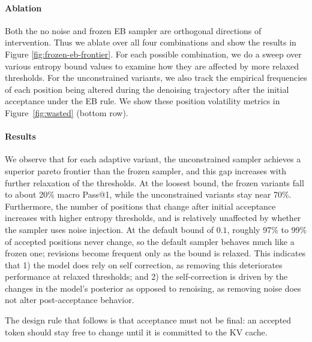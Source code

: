 \paragraph{Ablation}
Both the no noise and frozen EB sampler are orthogonal directions of intervention. Thus we ablate over all four combinations and show the results in Figure \ref{fig:frozen-eb-frontier}.
For each possible combination, we do a sweep over various entropy bound values to examine how they are affected by more relaxed thresholds. 
For the unconstrained variants, we also track the empirical frequencies of each position being altered during the denoising trajectory after the initial acceptance under the EB rule.
We show these position volatility metrics in Figure~\ref{fig:wasted} (bottom row).


\paragraph{Results}
We observe that for each adaptive variant, the unconstrained sampler achieves a superior pareto frontier than the frozen sampler, and this gap increases with further relaxation of the thresholds.
At the loosest bound, the frozen variants fall to about 20\% macro Pass@1, while the unconstrained variants stay near 70\%.
Furthermore, the number of positions that change after initial acceptance increases with higher entropy thresholds, and is relatively unaffected by whether the sampler uses noise injection.
At the default bound of $0.1$, roughly 97\% to 99\% of accepted positions never change, so the default sampler behaves much like a frozen one; revisions become frequent only as the bound is relaxed.
This indicates that 1) the model does rely on self correction, as removing this deteriorates performance at relaxed thresholds; and 2) the self-correction is driven by the changes in the model's posterior as opposed to renoising, as removing noise does not alter post-acceptance behavior.

The design rule that follows is that acceptance must not be final: an accepted token should stay free to change until it is committed to the KV cache.
